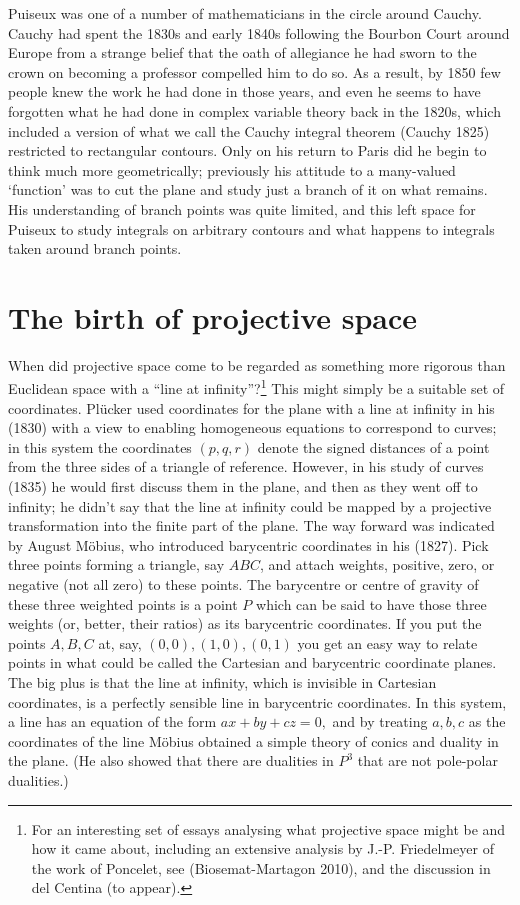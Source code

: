 Puiseux was one of a number of mathematicians in the circle around Cauchy. Cauchy had spent the 1830s and early 1840s following the Bourbon Court around Europe from a strange belief that the oath of allegiance he had sworn to the crown on becoming a professor compelled him to do so. As a result, by 1850 few people knew the work he had done in those years, and even he seems to have forgotten what he had done in complex variable theory back in the 1820s, which included a version of what we call the Cauchy integral theorem (Cauchy 1825) restricted to rectangular contours. Only on his return to Paris did he begin to think much more geometrically; previously his attitude to a many-valued `function' was to cut the plane and study just a branch of it on what remains. His understanding of branch points was quite limited, and this left space for Puiseux to study integrals on arbitrary contours   and what happens to integrals taken around branch points. 

\section{The birth of projective space}
When did projective space come to be regarded as something more rigorous than Euclidean space with a ``line at infinity''?\footnote{For an interesting  set of essays analysing what projective space might be and how it came about, including an extensive analysis by J.-P. Friedelmeyer of the work of Poncelet, see (Biosemat-Martagon 2010), and the discussion in del Centina (to appear).}
 This might simply be a suitable set of coordinates. Pl\"ucker used coordinates for the plane with a line at infinity in his (1830) with a view to enabling homogeneous equations to correspond to curves; in this system the coordinates $(p, q, r)$ denote the signed distances of a point from the three sides of a triangle of reference. However, in his study of curves (1835) he would first discuss them in  the plane, and then as they went off to infinity; he didn't say that the line at infinity could be mapped by a projective transformation into the finite part of the plane.  The way forward was indicated by August M\"obius, who introduced barycentric coordinates in his (1827). Pick three points forming a triangle, say $ABC$, and attach weights, positive, zero, or negative (not all zero) to these points. The barycentre or centre of gravity of these three weighted points is a point $P$ which can be said to have those three weights (or, better, their ratios) as its barycentric coordinates. If you put the points $A, B, C$ at, say,  $(0, 0), (1, 0), (0, 1)$ you get an easy way to relate points in what could be called the Cartesian and barycentric coordinate planes. The big plus is that the line at infinity, which is invisible in Cartesian coordinates, is a perfectly sensible line in barycentric coordinates. In this system, a line has an equation of the form $ax+by+cz=0,$ and by treating $a, b, c$ as the coordinates of the line M\"obius obtained a simple theory of conics and duality in the plane. (He also showed that there are dualities in $P^3$ that are not pole-polar dualities.)

